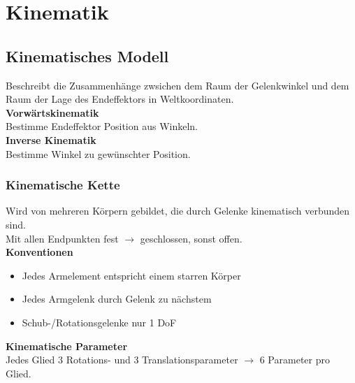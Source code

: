 

\section{Kinematik}%
\label{kin:sec:kinematik}
\subsection{Kinematisches Modell}%
\label{kin:sub:kinematisches-modell}
Beschreibt die Zusammenhänge zwsichen dem Raum der Gelenkwinkel und dem Raum der Lage des Endeffektors in
Weltkoordinaten.\\

\textbf{Vorwärtskinematik}\\
Bestimme Endeffektor Position aus Winkeln.\\

\textbf{Inverse Kinematik}\\
Bestimme Winkel zu gewünschter Position.\\

\subsubsection{Kinematische Kette}%
\label{kin:ssub:kinematische-kette}
Wird von mehreren Körpern gebildet, die durch Gelenke kinematisch verbunden sind.\\
Mit allen Endpunkten fest \(\rightarrow\) geschlossen, sonst offen.\\

\textbf{Konventionen}
\begin{itemize}
\item Jedes Armelement entspricht einem starren Körper
\item Jedes Armgelenk durch Gelenk zu nächstem
\item Schub-/Rotationsgelenke nur 1 DoF
\end{itemize}

\textbf{Kinematische Parameter}\\
Jedes Glied 3 Rotations- und 3 Translationsparameter \(\rightarrow\) 6 Parameter pro Glied.

